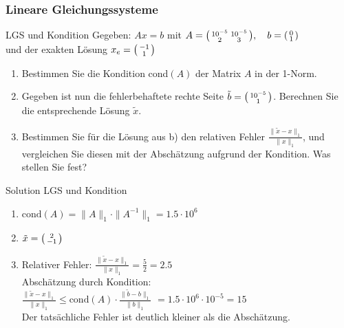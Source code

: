 \subsubsection{Lineare Gleichungssysteme}

\begin{example2}{LGS und Kondition}
Gegeben: $Ax = b$ mit
$A = \begin{psmallmatrix}
10^{-5} & 10^{-5}\\
2 & 3
\end{psmallmatrix}, \quad
b = \begin{psmallmatrix}
0\\
1
\end{psmallmatrix}$\\
und der exakten Lösung $x_e = \begin{psmallmatrix}-1\\1\end{psmallmatrix}$
\begin{enumerate}
    \item Bestimmen Sie die Kondition cond$(A)$ der Matrix $A$ in der 1-Norm.
    
    \item Gegeben ist nun die fehlerbehaftete rechte Seite $\tilde{b} = \begin{psmallmatrix}10^{-5}\\1\end{psmallmatrix}$. Berechnen Sie die entsprechende Lösung $\tilde{x}$.
    
    \item Bestimmen Sie für die Lösung aus b) den relativen Fehler $\frac{\|\tilde{x}-x\|_1}{\|x\|_1}$, und vergleichen Sie diesen mit der Abschätzung aufgrund der Kondition. Was stellen Sie fest?
\end{enumerate}
\end{example2}

\begin{KR}{Solution LGS und Kondition}
\begin{enumerate}
    \item $\text{cond}(A) = \|A\|_1 \cdot \|A^{-1}\|_1 = 1.5 \cdot 10^6$
    
    \item $\tilde{x} = \begin{psmallmatrix}2\\-1\end{psmallmatrix}$
    
    \item Relativer Fehler: $\frac{\|\tilde{x}-x\|_1}{\|x\|_1} = \frac{5}{2} = 2.5$\\
    Abschätzung durch Kondition:\\
    $\frac{\|\tilde{x}-x\|_1}{\|x\|_1} \leq \text{cond}(A) \cdot \frac{\|\tilde{b}-b\|_1}{\|b\|_1}$
    $= 1.5 \cdot 10^6 \cdot 10^{-5} = 15$\\
    Der tatsächliche Fehler ist deutlich kleiner als die Abschätzung.
\end{enumerate}
\end{KR}

